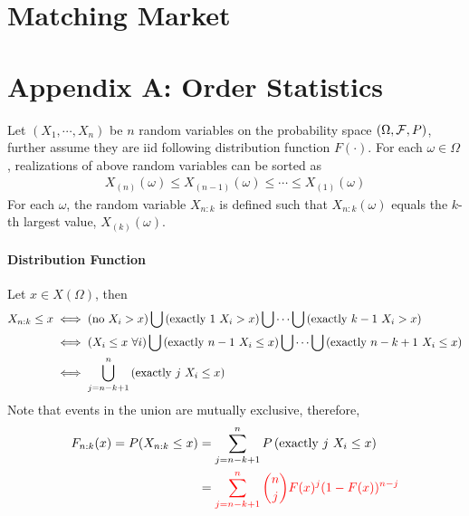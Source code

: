 \documentclass{article}
\begin{document}
	\section{Matching Market}

	\section{Appendix A: Order Statistics}
	\begin{definition}
		Let $(X_1, \cdots, X_n)$ be $n$ random variables on the probability space $(\Omega, \mathcal{{F}}, P)$, further assume they are iid following distribution function $F(\cdot)$. For each $\omega \in \Omega$, realizations of above random variables can be sorted as
		\begin{align}
			X_{(n)}(\omega) \leq X_{(n-1)}(\omega) \leq \cdots \leq X_{(1)}(\omega)
		\end{align}
		For each $\omega$, the random variable $X_{n:k}$ is defined such that $X_{n:k}(\omega)$ equals the $k$-th largest value, $X_{(k)}(\omega)$.
	\end{definition}
	
	\paragraph{Distribution Function} Let $x \in X(\Omega)$, then 
	\begin{align}
		X_{n:k} \leq x
		&\iff (\text{{no $X_i > x$}}) \bigcup \left(\text{{exactly $1$ $X_i > x$}}\right) \bigcup  \cdots \bigcup \left(\text{{exactly $k-1$ $X_i > x$}}\right) \\
		&\iff (X_i \leq x\ \forall i) \bigcup \left(\text{{exactly $n-1$ $X_i \leq x$}}\right) \bigcup  \cdots \bigcup \left(\text{{exactly $n-k+1$ $X_i \leq x$}}\right) \\
		&\iff \bigcup_{j=n-k+1}^n \left(\text{{exactly $j$ $X_i \leq x$}}\right)
	\end{align}
	Note that events in the union are mutually exclusive, therefore,
	\begin{align}
		F_{n:k}(x) = P(X_{n:k} \leq x)
		&= \sum_{j=n-k+1}^n P\left(\text{{exactly $j$ $X_i \leq x$}}\right) \\
		&= \textcolor{red}{\sum_{j=n-k+1}^n \binom{n}{j} F(x)^j (1 - F(x))^{n-j}}
	\end{align}
\end{document}
